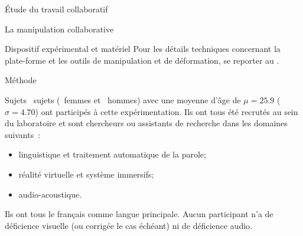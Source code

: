 \documentclass[myfrancais]{mythesis}
\begin{document}
\begin{mypart}{Étude du travail collaboratif}
\begin{mychapter}{La manipulation collaborative}
\begin{mysection}{Dispositif expérimental et matériel}
				Pour les détails techniques concernant la plate-forme et les outils de manipulation et de déformation, se reporter au .
			\end{mysection}
			\begin{mysection}{Méthode}
				\begin{mysubsection}[sse-exp2-Sujets]{Sujets}
					~sujets (~femmes et ~hommes) avec une moyenne d'âge de $\mu = 25.9$ ($\sigma = 4.70$) ont participés à cette expérimentation.
					Ils ont tous été recrutés au sein du laboratoire  et sont chercheurs ou assistants de recherche dans les domaines suivants~:
					\begin{itemize}
						\item linguistique et traitement automatique de la parole;
						\item réalité virtuelle et système immersifs;
						\item audio-acoustique.
					\end{itemize}
					Ils ont tous le français comme langue principale.
					Aucun participant n'a de déficience visuelle (ou corrigée le cas échéant) ni de déficience audio.


\end{mysubsection}
\end{mysection}
\end{mychapter}
\end{mypart}
\end{document}
